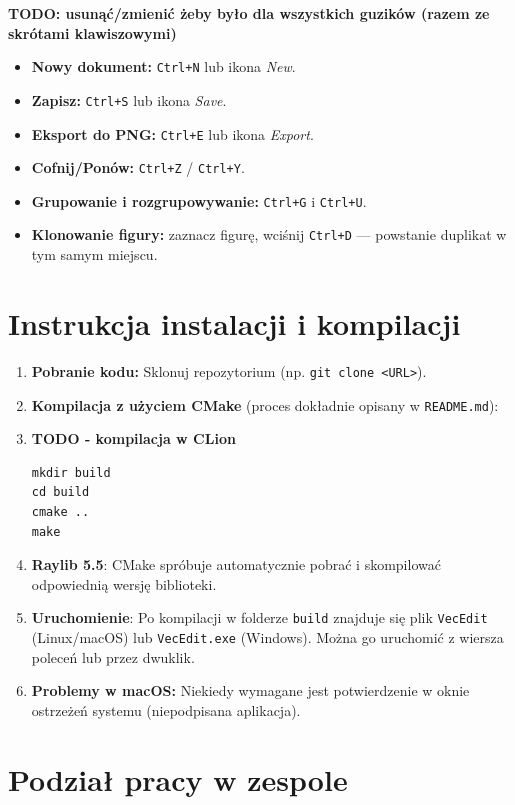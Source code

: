 \documentclass[a4paper,12pt]{article}
\begin{document}
\textbf{TODO: usunąć/zmienić żeby było dla wszystkich guzików (razem ze skrótami klawiszowymi)}

\begin{itemize}
    \item \textbf{Nowy dokument:} \texttt{Ctrl+N} lub ikona \emph{New}.
    \item \textbf{Zapisz:} \texttt{Ctrl+S} lub ikona \emph{Save}.
    \item \textbf{Eksport do PNG:} \texttt{Ctrl+E} lub ikona \emph{Export}.
    \item \textbf{Cofnij/Ponów:} \texttt{Ctrl+Z} / \texttt{Ctrl+Y}.
    \item \textbf{Grupowanie i rozgrupowywanie:} \texttt{Ctrl+G} i \texttt{Ctrl+U}.
    \item \textbf{Klonowanie figury:} zaznacz figurę, wciśnij \texttt{Ctrl+D} 
    — powstanie duplikat w tym samym miejscu.
\end{itemize}

\section{Instrukcja instalacji i kompilacji}
\begin{enumerate}
    \item \textbf{Pobranie kodu:} Sklonuj repozytorium (np. \texttt{git clone <URL>}).
    \item \textbf{Kompilacja z użyciem CMake} (proces dokładnie opisany w \texttt{README.md}):
    \item \textbf{TODO - kompilacja w CLion}
\begin{verbatim}
mkdir build
cd build
cmake ..
make
\end{verbatim}
    \item \textbf{Raylib 5.5}: CMake spróbuje automatycznie pobrać i
      skompilować odpowiednią wersję biblioteki.
    \item \textbf{Uruchomienie}: Po kompilacji w folderze \texttt{build} znajduje się 
    plik \texttt{VecEdit} (Linux/macOS) lub \texttt{VecEdit.exe} (Windows). 
    Można go uruchomić z wiersza poleceń lub przez dwuklik. 
    \item \textbf{Problemy w macOS:} Niekiedy wymagane jest potwierdzenie
    w oknie ostrzeżeń systemu (niepodpisana aplikacja).
\end{enumerate}

\section{Podział pracy w zespole}
\end{document}
